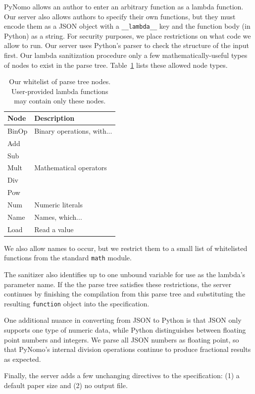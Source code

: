 \documentclass{proc}
\begin{document}
PyNomo allows an author to enter an arbitrary function as a lambda
function.
Our server also allows authors to specify their own functions, but
they must encode them as a JSON object with a \texttt{\_\_lambda\_\_} key
and the function body (in Python) as a string.
For security purposes, we place restrictions on what code we allow to
run.
Our server uses Python's parser to check the structure of the input
first.
Our lambda sanitization procedure only a few mathematically-useful
types of nodes to exist in the parse tree.
Table~\ref{tab:allowed-ast} lists these allowed node types.
\begin{table}
\label{tab:allowed-ast}
\begin{center}
\begin{tabular}{l|l}
\textbf{Node} & \textbf{Description} \\ \hline
BinOp & Binary operations, with... \\
Add & \multirow{5}{*}{Mathematical operators} \\
Sub \\
Mult \\
Div \\
Pow \\ \hline
Num & Numeric literals \\ \hline
Name & Names, which... \\
Load & Read a value
\end{tabular}
\end{center}
\caption{Our whitelist of parse tree nodes. User-provided lambda
  functions may contain only these nodes.}
\end{table}
We also allow names to occur, but we restrict them to a small list of
whitelisted functions from the standard \texttt{math} module.

The sanitizer also identifies up to one unbound variable for use as
the lambda's parameter name.
If the the parse tree satisfies these restrictions, the server
continues by finishing the compilation from this parse tree and
substituting the resulting \texttt{function} object into the
specification.

One additional nuance in converting from JSON to Python is that JSON
only supports one type of numeric data, while Python distinguishes
between floating point numbers and integers.
We parse all JSON numbers as floating point, so that PyNomo's internal
division operations continue to produce fractional results as
expected.

Finally, the server adds a few unchanging directives to the
specification: (1) a default paper size and (2) no output file.
\end{document}
